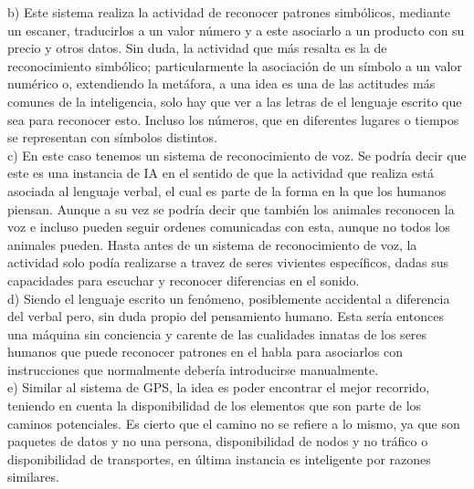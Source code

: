 b) Este sistema realiza la actividad de reconocer patrones simbólicos, mediante un escaner, traducirlos a un valor número y a este asociarlo a un producto con su precio y otros datos. Sin duda, la actividad que más resalta es la de reconocimiento simbólico; particularmente la asociación de un símbolo a un valor numérico o, extendiendo la metáfora, a una idea es una de las actitudes más comunes de la inteligencia, solo hay que ver a las letras de el lenguaje escrito que sea para reconocer esto. Incluso los números, que en diferentes lugares o tiempos se representan con símbolos distintos. \\

c) En este caso tenemos un sistema de reconocimiento de voz. Se podría decir que este es una instancia de IA en el sentido de que la actividad que realiza está asociada al lenguaje verbal, el cual es parte de la forma en la que los humanos piensan. Aunque a su vez se podría decir que también los animales reconocen la voz e incluso pueden seguir ordenes comunicadas con esta, aunque no todos los animales pueden. Hasta antes de un sistema de reconocimiento de voz, la actividad solo podía realizarse a travez de seres vivientes específicos, dadas sus capacidades para escuchar y reconocer diferencias en el sonido. \\

d) Siendo el lenguaje escrito un fenómeno, posiblemente accidental a diferencia del verbal pero, sin duda propio del pensamiento humano. Esta sería entonces una máquina sin conciencia y carente de las cualidades innatas de los seres humanos que puede reconocer patrones en el habla para asociarlos con instrucciones que normalmente debería introducirse manualmente. \\

e) Similar al sistema de GPS, la idea es poder encontrar el mejor recorrido, teniendo en cuenta la disponibilidad de los elementos que son parte de los caminos potenciales. Es cierto que el camino no se refiere a lo mismo, ya que son paquetes de datos y no una persona, disponibilidad de nodos y no tráfico o disponibilidad de transportes, en última instancia es inteligente por razones similares.

\bigskip